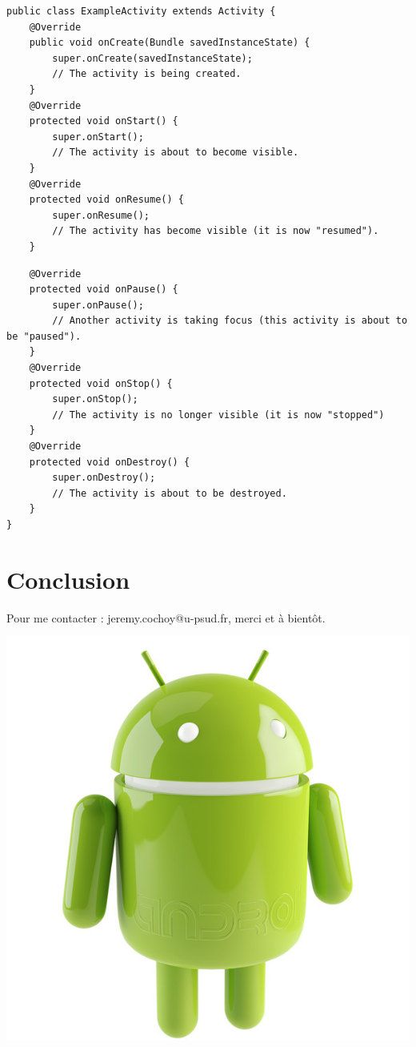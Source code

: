 \documentclass{beamer}
\begin{document}
\begin{frame}[fragile]
\begin{lstlisting}
public class ExampleActivity extends Activity {
    @Override
    public void onCreate(Bundle savedInstanceState) {
        super.onCreate(savedInstanceState);
        // The activity is being created.
    }
    @Override
    protected void onStart() {
        super.onStart();
        // The activity is about to become visible.
    }
    @Override
    protected void onResume() {
        super.onResume();
        // The activity has become visible (it is now "resumed").
    }
\end{lstlisting}
\end{frame}
\begin{frame}[fragile]
\begin{lstlisting}
    @Override
    protected void onPause() {
        super.onPause();
        // Another activity is taking focus (this activity is about to be "paused").
    }
    @Override
    protected void onStop() {
        super.onStop();
        // The activity is no longer visible (it is now "stopped")
    }
    @Override
    protected void onDestroy() {
        super.onDestroy();
        // The activity is about to be destroyed.
    }
}
\end{lstlisting}

\end{frame}
\section{Conclusion}

\begin{frame}
\begin{center}
Pour me contacter : jeremy.cochoy@u-psud.fr, merci et à bientôt.

\medskip
\medskip
\medskip
\medskip

\includegraphics[scale=0.18]{android.jpg}
\end{center}
\end{frame}
\end{document}
